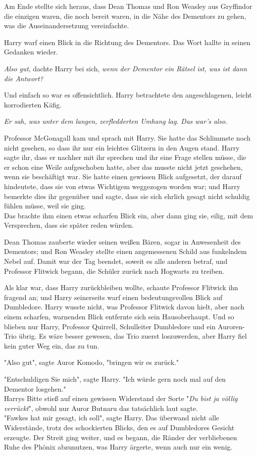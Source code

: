 {Am Ende stellte sich heraus, dass Dean Thomas und Ron Weasley aus Gryffindor die einzigen waren, die noch bereit waren, in die Nähe des Dementors zu gehen, was die Auseinandersetzung vereinfachte.

Harry warf einen Blick in die Richtung des Dementors. Das Wort hallte in seinen Gedanken wieder.

\emph{Also gut}, dachte Harry bei sich, \emph{wenn der Dementor ein Rätsel ist, was ist dann die Antwort?}

Und einfach so war es offensichtlich. Harry betrachtete den angeschlagenen, leicht korrodierten Käfig.

\emph{Er sah, was unter dem langen, zerfledderten Umhang lag.} \emph{Das war's also.}

Professor McGonagall kam und sprach mit Harry. Sie hatte das Schlimmste noch nicht gesehen, so dass ihr nur ein leichtes Glitzern in den Augen stand. Harry sagte ihr, dass er nachher mit ihr sprechen und ihr eine Frage stellen müsse, die er schon eine Weile aufgeschoben hatte, aber das musste nicht jetzt geschehen, wenn sie beschäftigt war. Sie hatte einen gewissen Blick aufgesetzt, der darauf hindeutete, dass sie von etwas Wichtigem weggezogen worden war; und Harry bemerkte dies ihr gegenüber und sagte, dass sie sich ehrlich gesagt nicht schuldig fühlen müsse, weil sie ging.\\ Das brachte ihm einen etwas scharfen Blick ein, aber dann ging sie, eilig, mit dem Versprechen, dass sie später reden würden.

Dean Thomas zauberte wieder seinen weißen Bären, sogar in Anwesenheit des Dementors; und Ron Weasley stellte einen angemessenen Schild aus funkelndem Nebel auf. Damit war der Tag beendet, soweit es alle anderen betraf, und Professor Flitwick begann, die Schüler zurück nach Hogwarts zu treiben.

Als klar war, dass Harry zurückbleiben wollte, schaute Professor Flitwick ihn fragend an; und Harry seinerseits warf einen bedeutungsvollen Blick auf Dumbledore. Harry wusste nicht, was Professor Flitwick davon hielt, aber nach einem scharfen, warnenden Blick entfernte sich sein Hausoberhaupt. Und so blieben nur Harry, Professor Quirrell, Schulleiter Dumbledore und ein Auroren-Trio übrig. Es wäre besser gewesen, das Trio zuerst loszuwerden, aber Harry fiel kein guter Weg ein, das zu tun.

"Also gut", sagte Auror Komodo, "bringen wir es zurück."

"Entschuldigen Sie mich", sagte Harry. "Ich würde gern noch mal auf den Dementor losgehen."\\ Harrys Bitte stieß auf einen gewissen Widerstand der Sorte "\emph{Du bist ja völlig verrückt}", obwohl nur Auror Butnaru das tatsächlich laut sagte.\\ "Fawkes hat mir gesagt, ich soll", sagte Harry. Das überwand nicht alle Widerstände, trotz des schockierten Blicks, den es auf Dumbledores Gesicht erzeugte. Der Streit ging weiter, und es begann, die Ränder der verbliebenen Ruhe des Phönix abzunutzen, was Harry ärgerte, wenn auch nur ein wenig.

}
